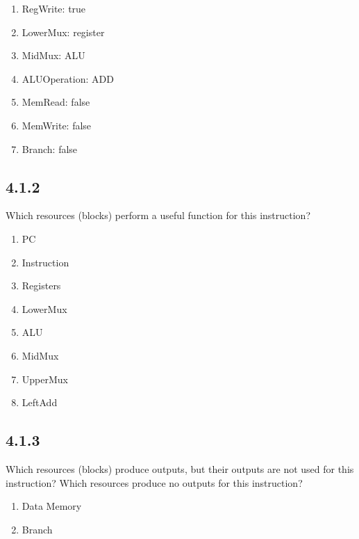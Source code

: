 \documentclass[paper=a4, fontsize=11pt]{scrartcl} %
\begin{document}
\begin{enumerate}
  \item RegWrite: true
  \item LowerMux: register
  \item MidMux: ALU
  \item ALUOperation: ADD
  \item MemRead: false
  \item MemWrite: false
  \item Branch: false
\end{enumerate}

\subsection{4.1.2}

\begin{fancyquotes}
  Which resources (blocks) perform a useful function for this instruction?
\end{fancyquotes}

\begin{enumerate}
  \item PC
  \item Instruction
  \item Registers
  \item LowerMux
  \item ALU
  \item MidMux
  \item UpperMux
  \item LeftAdd
\end{enumerate}

\subsection{4.1.3}

\begin{fancyquotes}
  Which resources (blocks) produce outputs, but their outputs are not used for this instruction? Which resources produce no outputs for this instruction?
\end{fancyquotes}

\begin{enumerate}
  \item Data Memory
  \item Branch
\end{enumerate}


\end{document}
